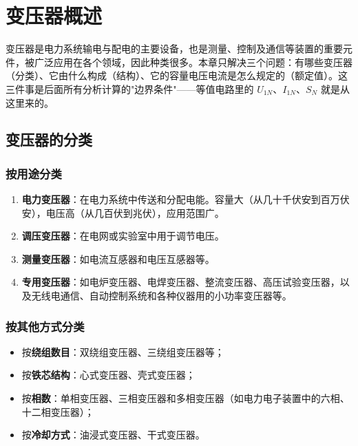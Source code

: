 \chapter{变压器概述}

变压器是电力系统输电与配电的主要设备，也是测量、控制及通信等装置的重要元件，被广泛应用在各个领域，因此种类很多。本章只解决三个问题：有哪些变压器（分类）、它由什么构成（结构）、它的容量电压电流是怎么规定的（额定值）。这三件事是后面所有分析计算的"边界条件"——等值电路里的 $U_{1N}$、$I_{1N}$、$S_N$ 就是从这里来的。

\section{变压器的分类}

\subsection{按用途分类}
\begin{enumerate}
  \item \textbf{电力变压器}：在电力系统中传送和分配电能。容量大（从几十千伏安到百万伏安），电压高（从几百伏到兆伏），应用范围广。
  \item \textbf{调压变压器}：在电网或实验室中用于调节电压。
  \item \textbf{测量变压器}：如电流互感器和电压互感器等。
  \item \textbf{专用变压器}：如电炉变压器、电焊变压器、整流变压器、高压试验变压器，以及无线电通信、自动控制系统和各种仪器用的小功率变压器等。
\end{enumerate}

\subsection{按其他方式分类}
\begin{itemize}
  \item 按\textbf{绕组数目}：双绕组变压器、三绕组变压器等；
  \item 按\textbf{铁芯结构}：心式变压器、壳式变压器；
  \item 按\textbf{相数}：单相变压器、三相变压器和多相变压器（如电力电子装置中的六相、十二相变压器）；
  \item 按\textbf{冷却方式}：油浸式变压器、干式变压器。
\end{itemize}

